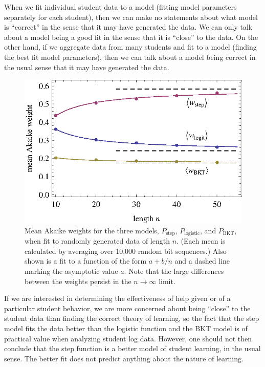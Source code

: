 \documentclass{edm_template}
\begin{document}
When we fit individual student data to a model (fitting
model parameters separately for each student), then we can make no
statements about what model is ``correct'' in the sense that it may
have generated the data.  We can only talk about a model being a good
fit in the sense that it is ``close'' to the data.
On the other hand, if we aggregate data from many students and fit to a
model (finding the best fit model parameters), then we can talk about
a model being correct in the usual sense that it may have generated
the data.  

\begin{figure}
   \centering\includegraphics{mean-weights.eps}
  \caption{Mean Akaike weights for the three models, 
   $P_\mathrm{step}$, $P_\mathrm{logistic}$, and $P_\mathrm{BKT}$, 
   when fit to randomly generated data of length $n$.
   (Each mean is calculated by averaging over 10,000 random bit sequences.)
   Also shown is a fit to a function of the form $a+b/n$ and
   a dashed line marking the asymptotic value $a$.
   Note that the large differences between the weights persist
   in the $n\to\infty$ limit.}\label{meanweight}
\end{figure}


If we are interested in determining the effectiveness
of help given or of a particular student behavior,
we are more concerned about being ``close'' to
the student data than finding the correct theory of learning, so the
fact that the step model fits the data better than the logistic function and
the BKT model is of practical value when analyzing student log data.  
However, one should not then conclude that the step function is a 
better model of student learning, in the usual sense.  The better fit does
not predict anything about the nature of learning.
\end{document}
